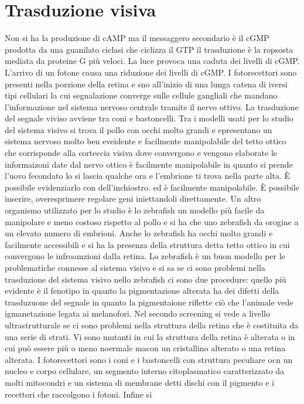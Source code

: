\section{Trasduzione visiva}
Non si ha la produzione di cAMP ma il messaggero secondario \`e il cGMP prodotta da una guanilato ciclasi che ciclizza il GTP il trasduzione \`e la ropsosta mediata da proteine G pi\`u 
veloci. La luce provoca una caduta dei livelli di cGMP. L'arrivo di un fotone causa una riduzione dei livelli di cGMP. I fotorecettori sono presenti nella porzione della retina e sno 
all'inizio di una lunga catena di iversi tipi cellulari la cui segnalazione converge sulle cellule gangliali che mandano l'informazione nel sistema nervoso centrale tramite il nervo
ottivo. La trasduzione del segnale viviso avviene tra coni e bastoncelli. Tra i modelli usati per lo studio del sistema visivo si trova il pollo con occhi molto grandi e epresentano un
sistema nervoso molto ben eveidente e facilmente manipolabile del tetto ottico che corrisponde alla corteccia visiva dove convergono e vengono elaborate le informaizoni date dal nervo 
ottico \`e facilmente manipolabile in quanto si prende l'uovo fecondato lo si lascia qualche ora e l'embrione ti trova nella parte alta. \`E possibile evidenziarlo con dell'inchiostro. 
ed \`e facilmente manipolabile. \`E possibile inserire, overesprimere regolare geni iniettandoli direttamente. Un altro organismo utilizzato per lo studio \`e lo zebrafish un modello 
pi\`u facile da manipolare e meno costoso rispetto al pollo e si ha che uno zebrafish da orogine a un elevato numero di embrioni. Anche lo zebrafish ha occhi molto grandi e facilmente
accessibili e si ha la presenza della struttura detta tetto ottico in cui convergono le infroamzioni dalla retina. Lo zebrafish \`e un buon modello per le problematiche connesse al 
sistema visivo e si sa se ci sono problemi nella trasduzione del sistema visivo nello zebrafish ci sono due procedure: quello pi\`u evidente \`e il fenotipo in quanto la pigmentazione 
alterata ha dei difetti della trasduzuone del segnale in quanto la pigmentaione riflette ci\`o che l'animale vede igmanetazione legata ai melanofori. Nel secondo screening si vede a 
livello ultrastrutturale se ci sono problemi nella struttura della retina che \`e costituita da una serie di strati. Vi sono mutanti in cui la struttura della retina \`e alterata o in 
cui pu\`o essere pi\`u o meno noermale macon un cristallino alterato o una retina alterata. I fotorecettori sono i coni e i bastoncelli con struttura peculiare ocn un nucleo e corpo 
cellulare, un segmento interno citoplasmatico caratterizzato da molti mitocondri e un sistema di membrane detti dischi con il pigmento e i recettori che raccolgono i fotoni. Infine si 
